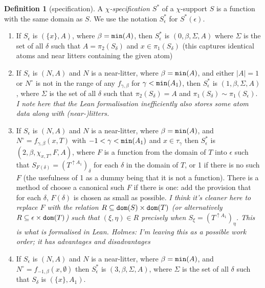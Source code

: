 \documentclass[112pt]{article}
\theoremstyle{definition}
\newtheorem{definition}[theorem]{Definition}
\theoremstyle{remark}
\newcommand{\rk}[1]{{\color{blue}\sl #1}}
\begin{document}
\begin{definition}[specification]
A {\em $\chi$-specification $S^*$\/} of a $\chi$-support $S$ is a function with the same domain as $S$.  We use the notation $S^*_\epsilon$ for $S^*(\epsilon)$.


\begin{enumerate}

\item  If $S_{\epsilon}$ is $(\{x\},A)$, where $\beta={\tt min}(A)$, then $S^*_\epsilon$ is $(0,\beta,\Sigma,A)$ where  $\Sigma$ is the set of all $\delta$ such that $A=\pi_2(S_\delta)$ and $x \in  \pi_1(S_\delta)$ (this captures identical atoms and near litters containing the given atom)

\item  If $S_\epsilon$ is $(N,A)$ and $N$ is a near-litter, where $\beta={\tt min}(A)$, and either $|A|=1$ or $N^\circ$ is not in the range of any $f_{\gamma,\beta}$ for $\gamma<{\tt min}(A_1)$, then $S^*_\epsilon$ is $(1,\beta,\Sigma,A)$, where $\Sigma$ is the set of all $\delta$ such that $\pi_2(S_\delta) = A$
and $\pi_1(S_\delta) \sim \pi_1(S_\epsilon)$. \rk{I note here that the Lean formalisation inefficiently also stores some atom data along with (near-)litters.}

\item  If $S_\epsilon$ is $(N,A)$ and $N$ is a near-litter, where $\beta={\tt min}(A)$, and $N^\circ=f_{\gamma,\beta}(x,T)$ with $-1<\gamma<{\tt min}(A_1)$ and $x\in \tau_\gamma$ then
$S^*_\epsilon$ is $(2,\beta,\chi_{x,T},F,A)$, where $F$ is a function from the domain of $T$ into $\epsilon$
such that $S_{F(\delta)} = (T^{\uparrow A_1})_\delta$ for each $\delta$ in the domain of $T$, or 1 if there is no such $F$ (the usefulness of 1 as a dummy being that it is not a function).  There is a method of choose a canonical such $F$ if there is one:  add the provision that for each $\delta$, $F(\delta)$ is chosen as small as possible. \rk{I think it's cleaner here to replace $F$ with the relation $R \subseteq {\tt dom}(S) \times {\tt dom}(T)$ (or alternatively $R \subseteq \epsilon \times {\tt dom}(T)$) such that $(\xi, \eta) \in R$ precisely when $S_\xi = (T^{\uparrow A_1})_\eta$. This is what is formalised in Lean.   Holmes:  I'm leaving this as a possible work order;  it has advantages and disadvantages}

\item  If $S_\epsilon$ is $(N,A)$ and $N$ is a near-litter, where $\beta={\tt min}(A)$, and $N^\circ=f_{-1,\beta}(x,\emptyset)$  then $S^*_\epsilon$ is $(3,\beta,\Sigma,A)$, where  $\Sigma$ is the set of all $\delta$ such that $S_\delta$ is $(\{x\},A_1)$.

\end{enumerate}
\end{definition}
\end{document}

